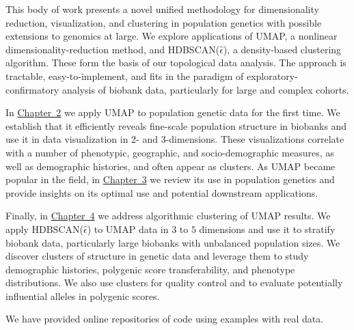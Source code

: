 This body of work presents a novel unified methodology for dimensionality reduction, visualization, and clustering in population genetics with possible extensions to genomics at large. We explore applications of UMAP, a nonlinear dimensionality-reduction method, and HDBSCAN($\hat{\epsilon}$), a density-based clustering algorithm. These form the basis of our topological data analysis. The approach is tractable, easy-to-implement, and fits in the paradigm of exploratory-confirmatory analysis of biobank data, particularly for large and complex cohorts. 

In \hyperref[chap:chapter2]{Chapter~2} we apply UMAP to population genetic data for the first time. We establish that it efficiently reveals fine-scale population structure in biobanks and use it in data visualization in 2- and 3-dimensions. These visualizations correlate with a number of phenotypic, geographic, and socio-demographic measures, as well as demographic histories, and often appear as clusters. As UMAP became popular in the field, in \hyperref[chap:chapter3]{Chapter~3} we review its use in population genetics and provide insights on its optimal use and potential downstream applications.

Finally, in \hyperref[chap:chapter4]{Chapter~4} we address algorithmic clustering of UMAP results. We apply HDBSCAN($\hat{\epsilon}$) to UMAP data in $3$ to $5$ dimensions and use it to stratify biobank data, particularly large biobanks with unbalanced population sizes. We discover clusters of structure in genetic data and leverage them to study demographic histories, polygenic score transferability, and phenotype distributions. We also use clusters for quality control and to evaluate potentially influential alleles in polygenic scores.

We have provided online repositories of code using examples with real data.